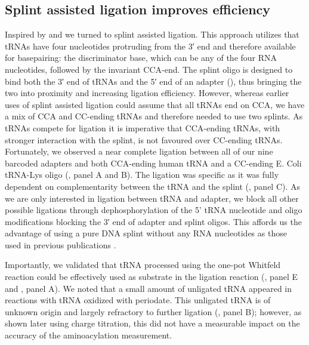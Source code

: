 \documentclass[9pt,lineno]{elife}
\begin{document}
\subsection{Splint assisted ligation improves efficiency}
Inspired by \cite{Smith2015-ht} and \cite{Shigematsu2017-tv} we turned to splint assisted ligation.
This approach utilizes that tRNAs have four nucleotides protruding from the 3′ end and therefore available for basepairing: the discriminator base, which can be any of the four RNA nucleotides, followed by the invariant CCA-end.
The splint oligo is designed to bind both the 3′ end of tRNAs and the 5′ end of an adapter (), thus bringing the two into proximity and increasing ligation efficiency.
However, whereas earlier uses of splint assisted ligation could assume that all tRNAs end on CCA, we have a mix of CCA and CC-ending tRNAs and therefore needed to use two splints.
As tRNAs compete for ligation it is imperative that CCA-ending tRNAs, with stronger interaction with the splint, is not favoured over CC-ending tRNAs.
Fortunately, we observed a near complete ligation between all of our nine barcoded adapters and both CCA-ending human tRNA and a CC-ending E. Coli tRNA-Lys oligo (, panel A and B).
The ligation was specific as it was fully dependent on complementarity between the tRNA and the splint (, panel C).
As we are only interested in ligation between tRNA and adapter, we block all other possible ligations through dephosphorylation of the 5' tRNA nucleotide and oligo modifications blocking the 3′ end of adapter and splint oligos.
This affords us the advantage of using a pure DNA splint without any RNA nucleotides as those used in previous publications \citep{Smith2015-ht, Shigematsu2017-tv, Pinkard2020-yd, Warren2021-wt, Thomas2021-fi, Lucas2023-vm}.

Importantly, we validated that tRNA processed using the one-pot Whitfeld reaction could be effectively used as substrate in the ligation reaction (, panel E and , panel A).
We noted that a small amount of unligated tRNA appeared in reactions with tRNA oxidized with periodate.
This unligated tRNA is of unknown origin and largely refractory to further ligation (, panel B); however, as shown later using charge titration, this did not have a measurable impact on the accuracy of the aminoacylation measurement.
\end{document}
